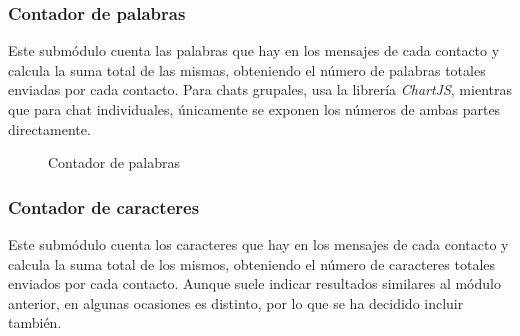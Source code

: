 \subsubsection{Contador de palabras}

Este submódulo cuenta las palabras que hay en los mensajes de cada contacto y calcula la suma total de las mismas, obteniendo el número de palabras totales enviadas por cada contacto. Para chats grupales, usa la librería \textit{ChartJS}, mientras que para chat individuales, únicamente se exponen los números de ambas partes directamente.

\begin{figure}[H]
	\centering
	\qquad
	\caption{Contador de palabras}
	\label{fig:chap4:word_count}
\end{figure}

\subsubsection{Contador de caracteres}

Este submódulo cuenta los caracteres que hay en los mensajes de cada contacto y calcula la suma total de los mismos, obteniendo el número de caracteres totales enviados por cada contacto. Aunque suele indicar resultados similares al módulo anterior, en algunas ocasiones es distinto, por lo que se ha decidido incluir también.

